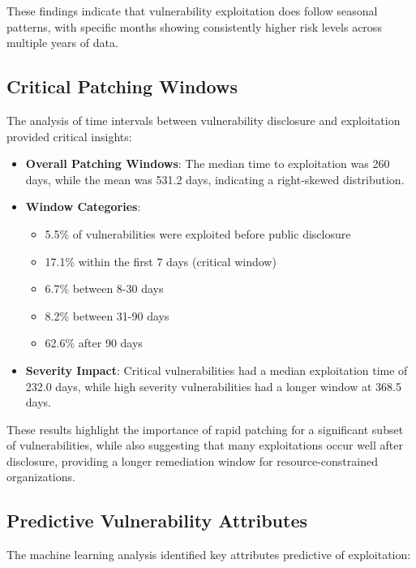 \documentclass[runningheads]{llncs}
\begin{document}
These findings indicate that vulnerability exploitation does follow seasonal patterns, with specific months showing consistently higher risk levels across multiple years of data.

\subsection{Critical Patching Windows}
The analysis of time intervals between vulnerability disclosure and exploitation provided critical insights:

\begin{itemize}
    \item \textbf{Overall Patching Windows}: The median time to exploitation was 260 days, while the mean was 531.2 days, indicating a right-skewed distribution.
    
    \item \textbf{Window Categories}:
    \begin{itemize}
        \item 5.5\% of vulnerabilities were exploited before public disclosure
        \item 17.1\% within the first 7 days (critical window)
        \item 6.7\% between 8-30 days
        \item 8.2\% between 31-90 days
        \item 62.6\% after 90 days
    \end{itemize}
    
    \item \textbf{Severity Impact}: Critical vulnerabilities had a median exploitation time of 232.0 days, while high severity vulnerabilities had a longer window at 368.5 days.
\end{itemize}

These results highlight the importance of rapid patching for a significant subset of vulnerabilities, while also suggesting that many exploitations occur well after disclosure, providing a longer remediation window for resource-constrained organizations.

\subsection{Predictive Vulnerability Attributes}
The machine learning analysis identified key attributes predictive of exploitation:
\end{document}
